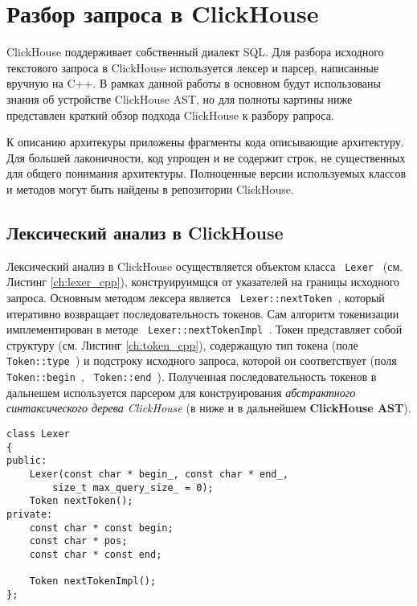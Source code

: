 \section{Разбор запроса в ClickHouse}
ClickHouse поддерживает собственный диалект SQL. Для разбора исходного текстового запроса в ClickHouse используется лексер и парсер, написанные вручную на C++. В рамках данной работы в основном будут использованы знания об устройстве ClickHouse AST, но для полноты картины ниже представлен краткий обзор подхода ClickHouse к разбору рапроса. 

К описанию архитекуры приложены фрагменты кода описывающие архитектуру. Для большей лаконичности, код упрощен и не содержит строк, не существенных для общего понимания архитектуры. Полноценные версии используемых классов и методов могут быть найдены в репозитории ClickHouse.  

\subsection{Лексический анализ в ClickHouse}

Лексический анализ в ClickHouse осуществляется объектом класса \texttt{ Lexer } (см. Листинг \ref{ch:lexer_cpp}), конструируимщся от указателей на границы исходного запроса. Основным методом лексера является \texttt{ Lexer::nextToken }, который итеративно возвращает последовательность токенов. Сам алгоритм токенизации имплементирован в методе \texttt{ Lexer::nextTokenImpl }. Токен представляет собой структуру (см. Листинг \ref{ch:token_cpp}), содержащую тип токена (поле \texttt{ Token::type }) и подстроку исходного запроса, которой он соответствует (поля \texttt{ Token::begin }, \texttt{ Token::end }). Полученная последовательность токенов в дальнешем используется парсером для конструирования \textit{абстрактного синтаксического дерева ClickHouse} (в ниже и в дальнейшем \textbf{ClickHouse AST}).

\begin{code}
    \label{ch:lexer_cpp}
    \begin{verbatim}
class Lexer
{
public:
    Lexer(const char * begin_, const char * end_,
        size_t max_query_size_ = 0);
    Token nextToken();
private:
    const char * const begin;
    const char * pos;
    const char * const end;

    Token nextTokenImpl();
};
    \end{verbatim}
\end{code}

